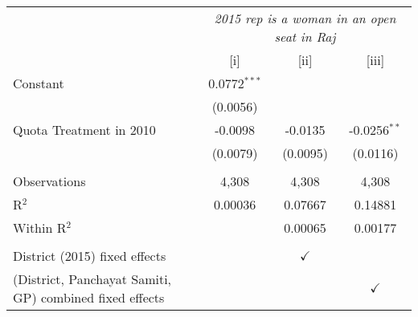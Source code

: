 
\begingroup
\centering
\begin{tabular}{lccc}
   \toprule
    & \multicolumn{3}{c}{\textit{2015 rep is a woman in an open seat in Raj}}\\
                                                           & [i]            & [ii]          & [iii]\\  
   \midrule 
   Constant                                                & 0.0772$^{***}$ &               &   \\   
                                                           & (0.0056)       &               &   \\   
   Quota Treatment in 2010                                 & -0.0098        & -0.0135       & -0.0256$^{**}$\\   
                                                           & (0.0079)       & (0.0095)      & (0.0116)\\   
    \\
   Observations                                            & 4,308          & 4,308         & 4,308\\  
   R$^2$                                                   & 0.00036        & 0.07667       & 0.14881\\  
   Within R$^2$                                            &                & 0.00065       & 0.00177\\  
    \\
   District (2015) fixed effects                           &                & $\checkmark$  & \\  
   (District, Panchayat Samiti, GP) combined fixed effects &                &               & $\checkmark$\\   
   \bottomrule
\end{tabular}
\par\endgroup


